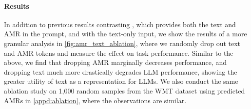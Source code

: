 \paragraph{Results}
In addition to previous results contrasting \ourmodel, which provides both the text and AMR in the prompt, and \basemodel with the text-only input, we
show the results of a more granular analysis in \cref{fig:amr_text_ablation}, where we randomly drop out text and AMR tokens and measure the effect on task performance. Similar to the above, we find that dropping AMR marginally decreases performance, and dropping text much more drastically degrades LLM performance, showing the greater utility of text as a representation for LLMs. We also conduct the same ablation study on 1,000 random samples from the WMT dataset using predicted AMRs in \cref{appd:ablation}, where the observations are similar.














